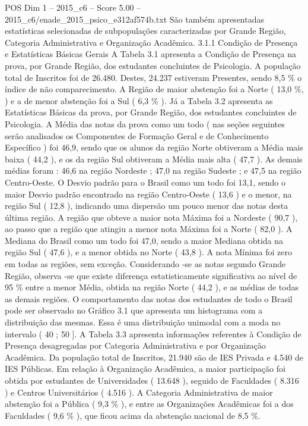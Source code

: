 \begin{textsample}{POS Dim 1 – 2015\_c6 – Score 5.00 – 2015\_c6/enade\_2015\_psico\_e312af574b.txt}
São também apresentadas estatísticas selecionadas de subpopulações caracterizadas por Grande Região, Categoria Administrativa e Organização Acadêmica. 3.1.1 Condição de Presença e Estatísticas Básicas Gerais A Tabela 3.1 apresenta a Condição de Presença na prova, por Grande Região, dos estudantes concluintes de Psicologia.
A população total de Inscritos foi de 26.480.
Destes, 24.237 estiveram Presentes, sendo 8,5 \% o índice de não comparecimento.
A Região de maior abstenção foi a Norte ( 13,0 \%, ) e a de menor abstenção foi a Sul ( 6,3 \% ).
Já a Tabela 3.2 apresenta as Estatísticas Básicas da prova, por Grande Região, dos estudantes concluintes de Psicologia.
A Média das notas da prova como um todo ( nas seções seguintes serão analisados os Componentes de Formação Geral e de Conhecimento Específico ) foi 46,9, sendo que os alunos da região Norte obtiveram a Média mais baixa ( 44,2 ), e os da região Sul obtiveram a Média mais alta ( 47,7 ).
As demais médias foram : 46,6 na região Nordeste ; 47,0 na região Sudeste ; e 47,5 na região Centro-Oeste.
O Desvio padrão para o Brasil como um todo foi 13,1, sendo o maior Desvio padrão encontrado na região Centro-Oeste ( 13,6 ) e o menor, na região Sul ( 12,8 ), indicando uma dispersão um pouco menor das notas desta última região.
A região que obteve a maior nota Máxima foi a Nordeste ( 90,7 ), ao passo que a região que atingiu a menor nota Máxima foi a Norte ( 82,0 ).
A Mediana do Brasil como um todo foi 47,0, sendo a maior Mediana obtida na região Sul ( 47,6 ), e a menor obtida no Norte ( 43,8 ).
A nota Mínima foi zero em todas as regiões, sem exceção.
Considerando -se as notas segundo Grande Região, observa -se que existe diferença estatisticamente significativa ao nível de 95 \% entre a menor Média, obtida na região Norte ( 44,2 ), e as médias de todas as demais regiões.
O comportamento das notas dos estudantes de todo o Brasil pode ser observado no Gráfico 3.1 que apresenta um histograma com a distribuição das mesmas.
Essa é uma distribuição unimodal com a moda no intervalo ( 40 ; 50 ].
A Tabela 3.3 apresenta informações referentes à Condição de Presença desagregadas por Categoria Administrativa e por Organização Acadêmica.
Da população total de Inscritos, 21.940 são de IES Privada e 4.540 de IES Públicas.
Em relação à Organização Acadêmica, a maior participação foi obtida por estudantes de Universidades ( 13.648 ), seguido de Faculdades ( 8.316 ) e Centros Universitários ( 4.516 ).
A Categoria Administrativa de maior abstenção foi a Pública ( 9,3 \% ), e entre as Organizações Acadêmicas foi a dos Faculdades ( 9,6 \% ), que ficou acima da abstenção nacional de 8,5 \%.

\end{textsample}
